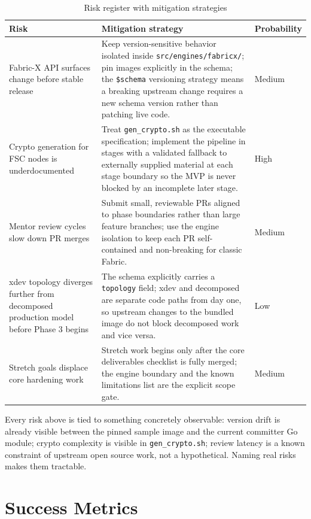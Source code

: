 \begin{table}[h]
\centering
\begin{tabularx}{\textwidth}{|p{3cm}|X|p{2cm}|}
\hline
\textbf{Risk} & \textbf{Mitigation strategy} & \textbf{Probability} \\
\hline
Fabric-X API surfaces change before stable release &
Keep version-sensitive behavior isolated inside
\texttt{src/engines/fabricx/}; pin images explicitly
in the schema; the \texttt{\$schema} versioning
strategy means a breaking upstream change requires
a new schema version rather than patching live code. &
Medium \\
\hline
Crypto generation for FSC nodes is underdocumented &
Treat \texttt{gen\_crypto.sh} as the executable
specification; implement the pipeline in stages with
a validated fallback to externally supplied material
at each stage boundary so the MVP is never blocked
by an incomplete later stage. &
High \\
\hline
Mentor review cycles slow down PR merges &
Submit small, reviewable PRs aligned to phase
boundaries rather than large feature branches;
use the engine isolation to keep each PR
self-contained and non-breaking for classic Fabric. &
Medium \\
\hline
xdev topology diverges further from decomposed
production model before Phase 3 begins &
The schema explicitly carries a \texttt{topology}
field; xdev and decomposed are separate code paths
from day one, so upstream changes to the bundled
image do not block decomposed work and vice versa. &
Low \\
\hline
Stretch goals displace core hardening work &
Stretch work begins only after the core deliverables
checklist is fully merged; the engine boundary and
the known limitations list are the explicit
scope gate. &
Medium \\
\hline
\end{tabularx}
\caption{Risk register with mitigation strategies}
\label{tab:risks}
\end{table}

Every risk above is tied to something concretely observable:
version drift is already visible between the pinned sample
image and the current committer Go module; crypto complexity
is visible in \texttt{gen\_crypto.sh}; review latency is
a known constraint of upstream open source work, not a
hypothetical. Naming real risks makes them tractable.

\section{Success Metrics}

